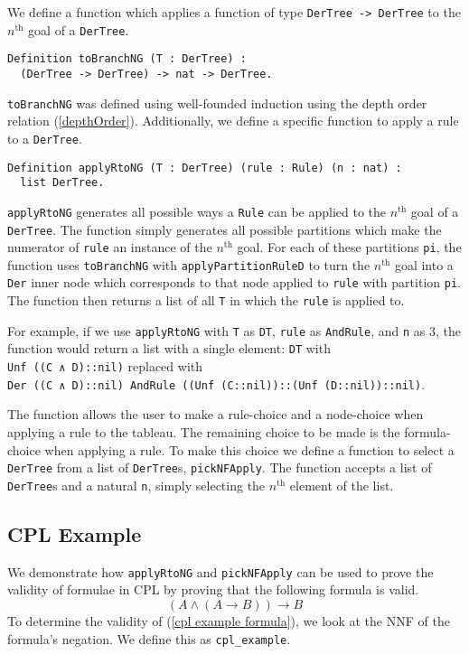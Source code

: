 \documentclass{llncs}
\newcommand*\lif{\mathbin{\to}}
\begin{document}
We define a function which applies a function of type
\verb+DerTree -> DerTree+ to the $n^{\textrm{th}}$ goal of a \verb+DerTree+.
%
\begin{verbatim}
Definition toBranchNG (T : DerTree) :
  (DerTree -> DerTree) -> nat -> DerTree.
\end{verbatim}
%
\verb+toBranchNG+ was defined using well-founded induction using the depth
order relation (\ref{depthOrder}). Additionally, we define a specific function
to apply a rule to a \verb+DerTree+.
%
\begin{verbatim}
Definition applyRtoNG (T : DerTree) (rule : Rule) (n : nat) :
  list DerTree.
\end{verbatim}
%
\verb+applyRtoNG+ generates all possible ways a \verb+Rule+ can be applied to
the $n^{\textrm{th}}$ goal of a \verb+DerTree+. The function simply generates
all possible partitions which make the numerator of \verb+rule+ an instance of
the $n^{\textrm{th}}$ goal. For each of these partitions \verb+pi+, the
function uses \verb+toBranchNG+ with \verb+applyPartitionRuleD+ to turn the
$n^{\textrm{th}}$ goal into a \verb+Der+ inner node which corresponds to that
node applied to \verb+rule+ with partition \verb+pi+. The function then returns
a list of all \verb+T+ in which the \verb+rule+ is applied to.

For example, if we use \verb+applyRtoNG+ with \verb+T+ as \verb+DT+,
\verb+rule+ as \verb+AndRule+, and \verb+n+ as $3$, the function would return
a list with a single element: \verb+DT+ with \\\verb+Unf ((C ∧ D)::nil)+ replaced
with \\\verb+Der ((C ∧ D)::nil) AndRule ((Unf (C::nil))::(Unf (D::nil))::nil)+.

The function allows the user to make a rule-choice and a node-choice when
applying a rule to the tableau. The remaining choice to be made is the
formula-choice when applying a rule. To make this choice we define a function
to select a \verb+DerTree+ from a list of \verb+DerTree+s, \verb+pickNFApply+.
The function accepts a list of \verb+DerTree+s and a natural \verb+n+,
simply selecting the $n^{\textrm{th}}$ element of the list.
%
\subsection{CPL Example}
%
We demonstrate how \verb+applyRtoNG+ and \verb+pickNFApply+ can be used to
prove the validity of formulae in CPL by proving that the following formula is
valid.
%
\begin{equation}
(A \wedge (A \lif B)) \lif B
\label{cpl example formula}
\end{equation}
%
To determine the validity of (\ref{cpl example formula}), we look at the NNF of
the formula's negation. We define this as
\verb+cpl_example+.
\end{document}
